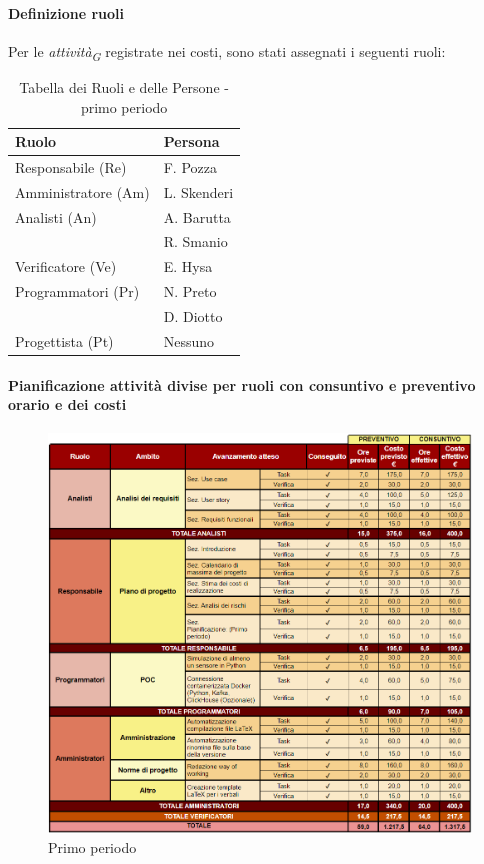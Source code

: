 \paragraph{Definizione ruoli}
Per le \textit{attività}\textsubscript{\textit{G}} registrate nei costi, sono stati assegnati i seguenti ruoli: 

\begin{table}[H]
    \centering
    \begin{tabular}{|L{4cm}|L{2cm}|}
        \hline
        \textbf{Ruolo} & \textbf{Persona} \\
        \hline
        \hline
        Responsabile (Re)   & F. Pozza \\
        \hline
        Amministratore (Am) & L. Skenderi \\
        \hline
        Analisti (An)       & A. Barutta \\
                            & R. Smanio \\
        \hline
        Verificatore (Ve)   & E. Hysa \\
        \hline
        Programmatori (Pr)  & N. Preto \\
                            & D. Diotto \\
        \hline
        Progettista (Pt)    & Nessuno \\
        \hline
    \end{tabular}
    \caption{Tabella dei Ruoli e delle Persone - primo periodo}
    \label{tab:Ruoli_persone_1}
    \end{table}

\newpage
\paragraph{Pianificazione attività divise per ruoli con consuntivo e preventivo orario e dei costi}\hspace{1pt}

\begin{figure}[H]
    \centering
    \includegraphics[height=0.9\textwidth]{../Images/periodo1.PNG}
    \caption{Primo periodo}
    \label{fig:Primo_periodo}
\end{figure}

